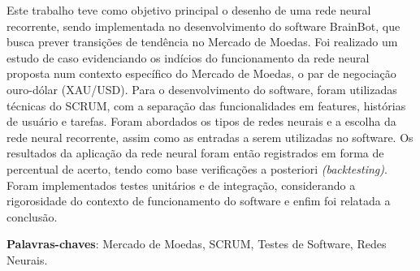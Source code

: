 \begin{resumo}
  Este trabalho teve como objetivo principal o desenho de uma rede neural
  recorrente, sendo implementada no desenvolvimento do software BrainBot, que
  busca prever transições de tendência no Mercado de Moedas. Foi realizado um
  estudo de caso evidenciando os indícios do funcionamento da rede neural
  proposta num contexto específico do Mercado de Moedas, o par de negociação
  ouro-dólar (XAU/USD). Para o desenvolvimento do software, foram utilizadas técnicas
  do SCRUM, com a separação das funcionalidades em features, histórias de
  usuário e tarefas. Foram abordados os tipos de redes neurais e a escolha
  da rede neural recorrente, assim como as entradas a serem utilizadas
  no software. Os resultados da aplicação da rede neural foram então registrados
  em forma de percentual de acerto, tendo como base verificações a posteriori
  \textit{(backtesting)}. Foram implementados testes unitários e de integração,
  considerando a rigorosidade do contexto de funcionamento do software e enfim
  foi relatada a conclusão.

 \vspace{\onelineskip}

 \noindent
 \textbf{Palavras-chaves}: Mercado de Moedas, SCRUM, Testes de Software, Redes
 Neurais.
\end{resumo}
